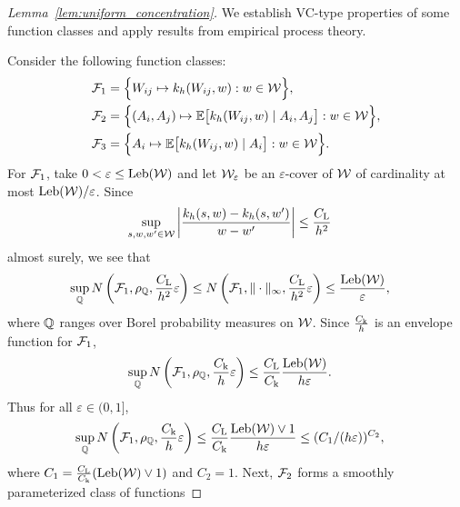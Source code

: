 \begin{proof}[Lemma~\ref{lem:uniform_concentration}]

  We establish VC-type properties of some function
  classes and apply results from empirical process theory.


  Consider the following function classes:
  \begin{align*}
    \mathcal{F}_1
    &=
    \Big\{
      W_{i j} \mapsto
      k_h(W_{i j},w)
      : w \in \mathcal{W}
    \Big\}, \\
    \mathcal{F}_2
    &=
    \Big\{
      (A_i, A_j) \mapsto
      \mathbb{E}\big[ k_h(W_{i j},w) \mid A_i, A_j \big]
      : w \in \mathcal{W}
    \Big\}, \\
    \mathcal{F}_3
    &=
    \Big\{
      A_i \mapsto
      \mathbb{E}\big[ k_h(W_{i j},w) \mid A_i \big]
      : w \in \mathcal{W}
    \Big\}.
  \end{align*}
  For $\mathcal{F}_1$,
  take $0 < \varepsilon \leq \operatorname{Leb}(\mathcal{W})$
  and let $\mathcal{W}_\varepsilon$ be an
  $\varepsilon$-cover of $\mathcal{W}$
  of cardinality at most $\operatorname{Leb}(\mathcal{W})/\varepsilon$.
  Since
  \begin{align*}
    \sup_{s, w, w' \in \mathcal{W}}
    \left|
    \frac{k_h(s,w) - k_h(s,w')}
    {w-w'}
    \right|
    &\leq
    \frac{C_\mathrm{L}}{h^2}
  \end{align*}
  almost surely,
  we see that
  \begin{align*}
    \sup_{\mathbb{Q}}
    N\left(\mathcal{F}_1, \rho_{\mathbb{Q}},
    \frac{C_\mathrm{L}}{h^2} \varepsilon \right)
    &\leq
    N\left(\mathcal{F}_1, \|\cdot\|_\infty,
    \frac{C_\mathrm{L}}{h^2} \varepsilon \right)
    \leq
    \frac{\operatorname{Leb}(\mathcal{W})}{\varepsilon},
  \end{align*}
  where $\mathbb{Q}$ ranges over Borel
  probability measures on $\mathcal{W}$.
  Since
  $\frac{C_\mathrm{k}}{h}$
  is an envelope function for $\mathcal{F}_1$,
  \begin{align*}
    \sup_{\mathbb{Q}}
    N\left(\mathcal{F}_1, \rho_{\mathbb{Q}},
    \frac{C_\mathrm{k}}{h} \varepsilon \right)
    &\leq
    \frac{C_\mathrm{L}}{C_\mathrm{k}}
    \frac{\operatorname{Leb}(\mathcal{W})}{h \varepsilon}.
  \end{align*}
  Thus for all $\varepsilon \in (0,1]$,
  \begin{align*}
    \sup_{\mathbb{Q}}
    N\left(\mathcal{F}_1, \rho_{\mathbb{Q}},
    \frac{C_\mathrm{k}}{h} \varepsilon \right)
    &\leq
    \frac{C_\mathrm{L}}{C_\mathrm{k}}
    \frac{\operatorname{Leb}(\mathcal{W}) \vee 1}{h \varepsilon}
    \leq
    (C_1/(h\varepsilon))^{C_2},
  \end{align*}
  where
  $C_1 = \frac{C_\mathrm{L}}{C_\mathrm{k}} (\operatorname{Leb}(\mathcal{W}) \vee 1)$
  and $C_2 = 1$.
  Next, $\mathcal{F}_2$ forms a smoothly parameterized class of functions

\end{proof}
